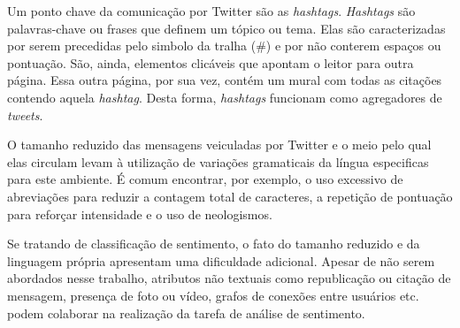 Um ponto chave da comunicação por Twitter são as \textit{hashtags}.
\textit{Hashtags} são palavras-chave ou frases que definem um tópico ou tema.
Elas são caracterizadas por serem precedidas pelo simbolo da tralha (\#) e por não conterem espaços ou pontuação.
São, ainda, elementos clicáveis que apontam o leitor para outra página.
Essa outra página, por sua vez, contém um mural com todas as citações contendo aquela \textit{hashtag}.
Desta forma, \textit{hashtags} funcionam como agregadores de \textit{tweets}.

O tamanho reduzido das mensagens veiculadas por Twitter e o meio pelo qual elas circulam levam à utilização de
variações gramaticais da língua especificas para este ambiente.
É comum encontrar, por exemplo, o uso excessivo de abreviações para reduzir a contagem total de caracteres, a repetição
de pontuação para reforçar intensidade e o uso de neologismos.

Se tratando de classificação de sentimento, o fato do tamanho reduzido e da linguagem própria apresentam uma dificuldade
adicional.
Apesar de não serem abordados nesse trabalho, atributos não textuais como republicação ou citação de mensagem, presença
de foto ou vídeo, grafos de conexões entre usuários etc. podem colaborar na realização da tarefa de análise de sentimento.
